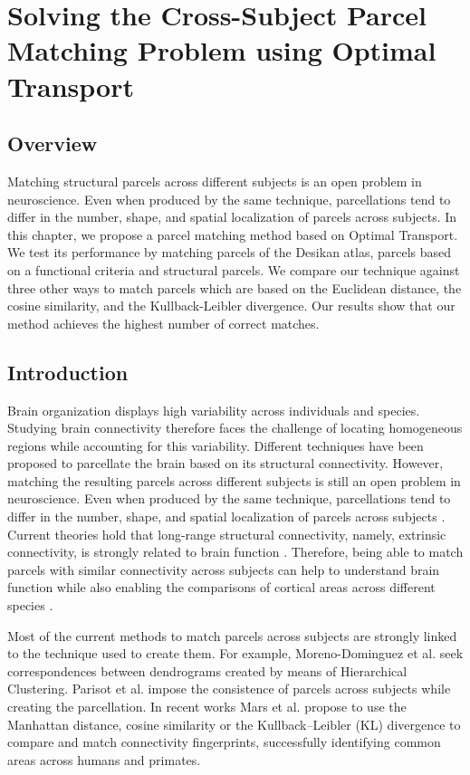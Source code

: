 \chapter{Solving the Cross-Subject Parcel Matching Problem using Optimal Transport}
%
\section{Overview}
Matching structural parcels across different subjects is an open problem in
neuroscience. Even when produced by the same technique, parcellations tend to
differ in the number, shape, and spatial localization of parcels across subjects.
In this chapter, we propose a parcel matching method based on Optimal Transport.
We test its performance by matching parcels of the Desikan atlas, parcels based
on a functional criteria and structural parcels. We compare our technique against
three other ways to match parcels which are based on the Euclidean distance, the
cosine similarity, and the Kullback-Leibler divergence. Our results show that
our method achieves the highest number of correct matches.

\section{Introduction}
Brain organization displays high variability across individuals and species. Studying brain connectivity therefore faces the challenge of locating homogeneous regions while accounting for this variability. Different techniques have been proposed to parcellate the brain based on its structural connectivity. However, matching the resulting parcels across different subjects is still an open problem in neuroscience. Even when produced by the same technique, parcellations tend to differ in the number, shape, and spatial localization of parcels across subjects \cite{Jbabdi2013}. Current theories hold that long-range structural connectivity, namely, extrinsic connectivity, is strongly related to brain function \cite{Passingham2002}. Therefore, being able to match parcels with similar connectivity across subjects can help to understand brain function while also enabling the comparisons of cortical areas across different species \cite{Mars2018}.

Most of the current methods to match parcels across subjects are strongly linked to the technique used to create them. For example, Moreno-Dominguez et al. \cite{Moreno-Dominguez2014} seek correspondences between dendrograms created by means of Hierarchical Clustering. Parisot et al. \cite{Paristot2015} impose the consistence of parcels across subjects while creating the parcellation. In recent works Mars et al. propose to use the Manhattan distance, cosine similarity \cite{Mars2016} or the Kullback–Leibler (KL) divergence \cite{Mars2018} to compare and match connectivity fingerprints, successfully identifying common areas across humans and primates.

